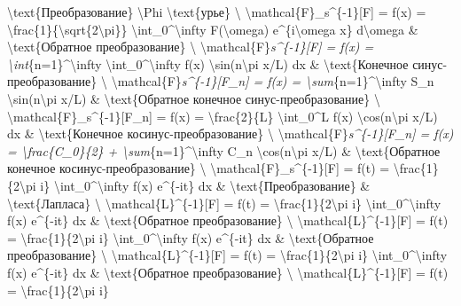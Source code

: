 \documentclass[
]{article}
\begin{document}
\begin{enumerate}
  \textbackslash text\{Преобразование\} \textbackslash Phi
  \textbackslash text\{урье\} \textbackslash{}
  \textbackslash mathcal\{F\}\_s\^{}\{-1\}{[}F{]} = f(x) =
  \textbackslash frac\{1\}\{\textbackslash sqrt\{2\textbackslash pi\}\}
  \textbackslash int\_0\^{}\textbackslash infty F(\textbackslash omega)
  e\^{}\{i\textbackslash omega x\} d\textbackslash omega \&
  \textbackslash text\{Обратное преобразование\} \textbackslash{}
  \textbackslash mathcal\{F\}\emph{s\^{}\{-1\}{[}F{]} = f(x) =
  \textbackslash int}\{n=1\}\^{}\textbackslash infty
  \textbackslash int\_0\^{}\textbackslash infty f(x)
  \textbackslash sin(n\textbackslash pi x/L) dx \&
  \textbackslash text\{Конечное синус-преобразование\} \textbackslash{}
  \textbackslash mathcal\{F\}\emph{s\^{}\{-1\}{[}F\_n{]} = f(x) =
  \textbackslash sum}\{n=1\}\^{}\textbackslash infty S\_n
  \textbackslash sin(n\textbackslash pi x/L) \&
  \textbackslash text\{Обратное конечное синус-преобразование\}
  \textbackslash{} \textbackslash mathcal\{F\}\_s\^{}\{-1\}{[}F\_n{]} =
  f(x) = \textbackslash frac\{2\}\{L\} \textbackslash int\_0\^{}L f(x)
  \textbackslash cos(n\textbackslash pi x/L) dx \&
  \textbackslash text\{Конечное косинус-преобразование\}
  \textbackslash{}
  \textbackslash mathcal\{F\}\emph{s\^{}\{-1\}{[}F\_n{]} = f(x) =
  \textbackslash frac\{C\_0\}\{2\} +
  \textbackslash sum}\{n=1\}\^{}\textbackslash infty C\_n
  \textbackslash cos(n\textbackslash pi x/L) \&
  \textbackslash text\{Обратное конечное косинус-преобразование\}
  \textbackslash{} \textbackslash mathcal\{F\}\_s\^{}\{-1\}{[}F{]} =
  f(t) = \textbackslash frac\{1\}\{2\textbackslash pi i\}
  \textbackslash int\_0\^{}\textbackslash infty f(x) e\^{}\{-it\} dx \&
  \textbackslash text\{Преобразование\} \&
  \textbackslash text\{Лапласа\} \textbackslash{}
  \textbackslash mathcal\{L\}\^{}\{-1\}{[}F{]} = f(t) =
  \textbackslash frac\{1\}\{2\textbackslash pi i\}
  \textbackslash int\_0\^{}\textbackslash infty f(x) e\^{}\{-it\} dx \&
  \textbackslash text\{Обратное преобразование\} \textbackslash{}
  \textbackslash mathcal\{L\}\^{}\{-1\}{[}F{]} = f(t) =
  \textbackslash frac\{1\}\{2\textbackslash pi i\}
  \textbackslash int\_0\^{}\textbackslash infty f(x) e\^{}\{-it\} dx \&
  \textbackslash text\{Обратное преобразование\} \textbackslash{}
  \textbackslash mathcal\{L\}\^{}\{-1\}{[}F{]} = f(t) =
  \textbackslash frac\{1\}\{2\textbackslash pi i\}
  \textbackslash int\_0\^{}\textbackslash infty f(x) e\^{}\{-it\} dx \&
  \textbackslash text\{Обратное преобразование\} \textbackslash{}
  \textbackslash mathcal\{L\}\^{}\{-1\}{[}F{]} = f(t) =
  \textbackslash frac\{1\}\{2\textbackslash pi i\}

\end{enumerate}
\end{document}
